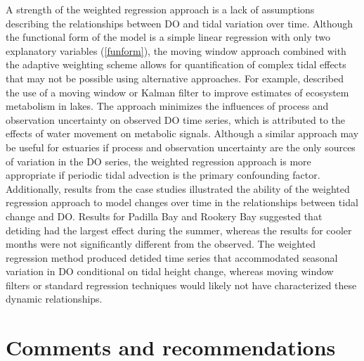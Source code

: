\documentclass[letterpaper,12pt,oneside]{article}\usepackage[]{graphicx}\usepackage[]{color}
\begin{document}
A strength of the weighted regression approach is a lack of assumptions describing the relationships between \ac{DO} and tidal variation over time.  Although the functional form of the model is a simple linear regression with only two explanatory variables (\cref{funform}), the moving window approach combined with the adaptive weighting scheme allows for quantification of complex tidal effects that may not be possible using alternative approaches.  For example, \citet{Batt12} described the use of a moving window or Kalman filter \citep{Harvey89} to improve estimates of ecosystem metabolism in lakes.  The approach minimizes the influences of process and observation uncertainty on observed \ac{DO} time series, which is attributed to the effects of water movement on metabolic signals.  Although a similar approach may be useful for estuaries if process and observation uncertainty are the only sources of variation in the \ac{DO} series, the weighted regression approach is more appropriate if periodic tidal advection is the primary confounding factor.  Additionally, results from the case studies illustrated the ability of the weighted regression approach to model changes over time in the relationships between tidal change and \ac{DO}.  Results for Padilla Bay and Rookery Bay suggested that detiding had the largest effect during the summer, whereas the results for cooler months were not significantly different from the observed.  The weighted regression method produced detided time series that accommodated seasonal variation in \ac{DO} conditional on tidal height change, whereas moving window filters or standard regression techniques would likely not have characterized these dynamic relationships.

\section{Comments and recommendations}
\end{document}
